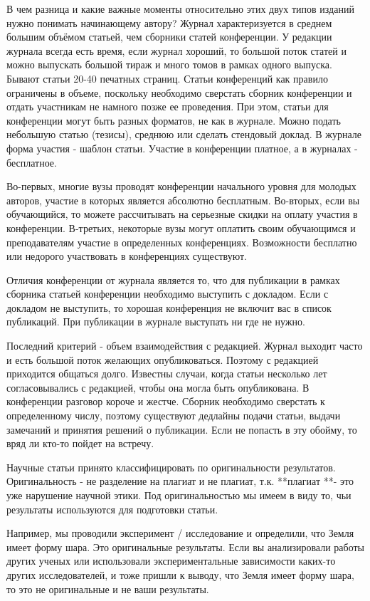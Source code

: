\documentclass{report}
\begin{document}
В чем разница и какие важные моменты относительно этих двух типов изданий нужно понимать начинающему автору?
Журнал характеризуется в среднем большим объёмом статьей, чем сборники статей конференции. У редакции журнала всегда есть время, если журнал хороший, то большой поток статей и можно выпускать большой тираж и много томов в рамках одного выпуска. Бывают статьи 20-40 печатных страниц. Статьи конференций как правило ограничены в объеме, поскольку необходимо сверстать сборник конференции и отдать участникам не намного позже ее проведения. При этом, статьи для конференции могут быть разных форматов, не как в журнале. Можно подать небольшую статью (тезисы), среднюю или сделать стендовый доклад. В журнале форма участия - шаблон статьи. Участие в конференции платное, а в журналах - бесплатное.

Во-первых, многие вузы проводят конференции начального уровня для молодых авторов, участие в которых является абсолютно бесплатным. Во-вторых, если вы обучающийся, то можете рассчитывать на серьезные скидки на оплату участия в конференции. В-третьих, некоторые вузы могут оплатить своим обучающимся и преподавателям участие в определенных конференциях. Возможности бесплатно или недорого участвовать в конференциях существуют.

Отличия конференции от журнала является то, что для публикации в рамках сборника статьей конференции необходимо выступить с докладом. Если с докладом не выступить, то хорошая конференция не включит вас в список публикаций. При публикации в журнале выступать ни где не нужно. 

Последний критерий - объем взаимодействия с редакцией. Журнал выходит часто и есть большой поток желающих опубликоваться. Поэтому с редакцией приходится общаться долго. Известны случаи, когда статьи несколько лет согласовывались с редакцией, чтобы она могла быть опубликована. В конференции разговор короче и жестче. Сборник необходимо сверстать к определенному числу, поэтому существуют дедлайны подачи статьи, выдачи замечаний и принятия решений о публикации. Если не попасть в эту обойму, то вряд ли кто-то пойдет на встречу.

Научные статьи принято классифицировать по оригинальности результатов. Оригинальность - не разделение на плагиат и не плагиат, т.к. **плагиат **- это уже нарушение научной этики. Под оригинальностью мы имеем в виду то, чьи результаты используются для подготовки статьи. 

Например, мы проводили эксперимент / исследование и определили, что Земля имеет форму шара. Это оригинальные результаты. Если вы анализировали работы других ученых или использовали экспериментальные зависимости каких-то других исследователей, и тоже пришли к выводу, что Земля имеет форму шара, то это не оригинальные и не ваши результаты.
\end{document}

